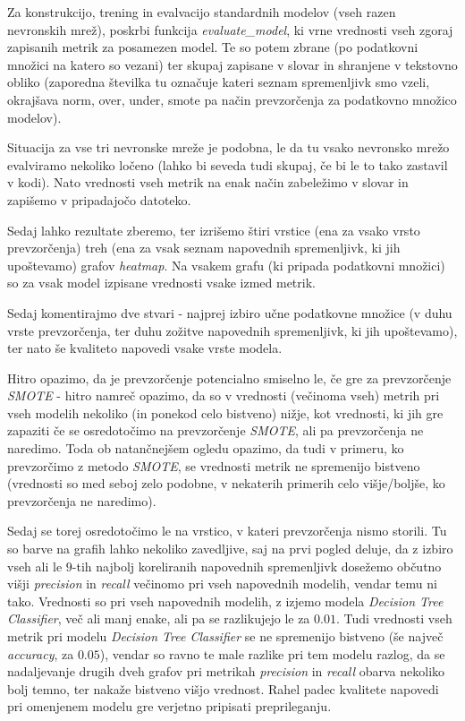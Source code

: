 \documentclass{article}
\begin{document}
Za konstrukcijo, trening in evalvacijo standardnih modelov (vseh razen nevronskih mrež), poskrbi funkcija \textit{evaluate\_model}, ki vrne vrednosti vseh zgoraj zapisanih metrik za posamezen model. 
Te so potem zbrane (po podatkovni množici na katero so vezani) ter skupaj zapisane v slovar in shranjene v tekstovno obliko (zaporedna številka tu označuje kateri seznam spremenljivk smo vzeli, okrajšava norm, over, under, smote pa način prevzorčenja za podatkovno množico modelov).

Situacija za vse tri nevronske mreže je podobna, le da tu vsako nevronsko mrežo evalviramo nekoliko ločeno (lahko bi seveda tudi skupaj, če bi le to tako zastavil v kodi). 
Nato vrednosti vseh metrik na enak način zabeležimo v slovar in zapišemo v pripadajočo datoteko. 

Sedaj lahko rezultate zberemo, ter izrišemo štiri vrstice (ena za vsako vrsto prevzorčenja) treh (ena za vsak seznam napovednih spremenljivk, ki jih upoštevamo) grafov \textit{heatmap}. 
Na vsakem grafu (ki pripada podatkovni množici) so za vsak model izpisane vrednosti vsake izmed metrik. 

Sedaj komentirajmo dve stvari - najprej izbiro učne podatkovne množice (v duhu vrste prevzorčenja, ter duhu zožitve napovednih spremenljivk, ki jih upoštevamo), ter nato še kvaliteto napovedi vsake vrste modela.

Hitro opazimo, da je prevzorčenje potencialno smiselno le, če gre za prevzorčenje \textit{SMOTE} - hitro namreč opazimo, da so v vrednosti (večinoma vseh) metrih pri vseh modelih nekoliko (in ponekod celo bistveno) nižje, kot vrednosti, ki jih gre zapaziti če se osredotočimo na prevzorčenje \textit{SMOTE}, ali pa prevzorčenja ne naredimo.
Toda ob natančnejšem ogledu opazimo, da tudi v primeru, ko prevzorčimo z metodo \textit{SMOTE}, se vrednosti metrik ne spremenijo bistveno (vrednosti so med seboj zelo podobne, v nekaterih primerih celo višje/boljše, ko prevzorčenja ne naredimo).

Sedaj se torej osredotočimo le na vrstico, v kateri prevzorčenja nismo storili. 
Tu so barve na grafih lahko nekoliko zavedljive, saj na prvi pogled deluje, da z izbiro vseh ali le $9$-tih najbolj koreliranih napovednih spremenljivk dosežemo občutno višji \textit{precision} in \textit{recall} večinomo pri vseh napovednih modelih, vendar temu ni tako. 
Vrednosti so pri vseh napovednih modelih, z izjemo modela \textit{Decision Tree Classifier}, več ali manj enake, ali pa se razlikujejo le za $0.01$.
Tudi vrednosti vseh metrik pri modelu \textit{Decision Tree Classifier} se ne spremenijo bistveno (še največ \textit{accuracy}, za $0.05$), vendar so ravno te male razlike pri tem modelu razlog, da se nadaljevanje drugih dveh grafov pri metrikah \textit{precision} in \textit{recall} obarva nekoliko bolj temno, ter nakaže bistveno višjo vrednost. 
Rahel padec kvalitete napovedi pri omenjenem modelu gre verjetno pripisati preprileganju. 
\end{document}

